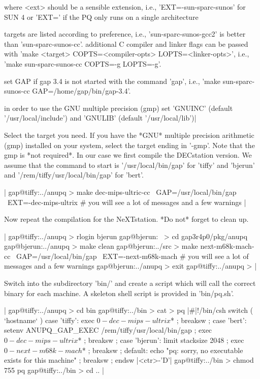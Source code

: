    where <ext> should be a sensible extension, i.e.,
   'EXT=-sun-sparc-sunos' for SUN 4 or 'EXT=' if the PQ only
   runs on a single architecture

   targets are listed according to preference,
   i.e., 'sun-sparc-sunos-gcc2' is better than 'sun-sparc-sunos-cc'.
   additional C compiler and linker flags can be passed with
   'make <target> COPTS=<compiler-opts> LOPTS=<linker-opts>',
   i.e., 'make sun-sparc-sunos-cc COPTS=-g LOPTS=-g'.

   set GAP if gap 3.4 is not started with the command 'gap',
   i.e., 'make sun-sparc-sunos-cc GAP=/home/gap/bin/gap-3.4'.

   in order to use the GNU multiple precision (gmp) set
   'GNUINC' (default '/usr/local/include') and 
   'GNULIB' (default '/usr/local/lib')|

Select the  target you need.  If  you  have the *GNU*  multiple precision
arithmetic (gmp)  installed on your  system, select the target  ending in
'-gmp'. Note that  the  gmp is  *not  required*.   In our  case we  first
compile   the DECstation version.   We assume  that  the command to start
{\GAP}    is  '/usr/local/bin/gap'   for   'tiffy'    and  'bjerun'   and
'/rem/tiffy/usr/local/bin/gap' for 'bert'.

|    gap@tiffy:../anupq > make dec-mips-ultric-cc \
                               GAP=/usr/local/bin/gap \
			       EXT=-dec-mips-ultrix
    # you will see a lot of messages and a few warnings |

Now repeat the compilation  for the NeXTstation. *Do not* forget to clean
up.

|    gap@tiffy:../anupq > rlogin bjerun
    gap@bjerun:~ > cd gap3r4p0/pkg/anupq
    gap@bjerun:../anupq > make clean
    gap@bjerun:../src > make next-m68k-mach-cc \
                             GAP=/usr/local/bin/gap \
			     EXT=-next-m68k-mach
    # you will see a lot of messages and a few warnings
    gap@bjerun:../anupq > exit
    gap@tiffy:../anupq > |

Switch into the subdirectory 'bin/'  and create a  script which will call
the correct binary for each machine. A skeleton  shell script is provided
in 'bin/pq.sh'.

|    gap@tiffy:../anupq > cd bin
    gap@tiffy:../bin > cat > pq
    |\#|!/bin/csh
    switch ( `hostname` )
      case 'tiffy':
        exec $0-dec-mips-ultrix $* ;
        breaksw ;
      case 'bert':
        setenv ANUPQ_GAP_EXEC /rem/tiffy/usr/local/bin/gap ;
        exec $0-dec-mips-ultrix $* ;
        breaksw ;
      case 'bjerun':
        limit stacksize 2048 ;
        exec $0-next-m68k-mach $* ;
        breaksw ;
      default:
        echo "pq: sorry, no executable exists for this machine" ;
        breaksw ;
    endsw
    |<ctr>-'D'|
    gap@tiffy:../bin > chmod 755 pq
    gap@tiffy:../bin > cd .. |

